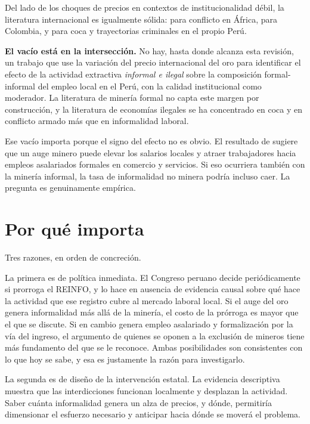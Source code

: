 \documentclass[11pt,a4paper]{article}
\begin{document}
Del lado de los choques de precios en contextos de institucionalidad débil, la literatura internacional es igualmente sólida: \citet{berman2017} para conflicto en África, \citet{dube2013} para Colombia, y \citet{sviatschi2022} para coca y trayectorias criminales en el propio Perú.

\textbf{El vacío está en la intersección.} No hay, hasta donde alcanza esta revisión, un trabajo que use la variación del precio internacional del oro para identificar el efecto de la actividad extractiva \emph{informal e ilegal} sobre la composición formal-informal del empleo local en el Perú, con la calidad institucional como moderador. La literatura de minería formal no capta este margen por construcción, y la literatura de economías ilegales se ha concentrado en coca y en conflicto armado más que en informalidad laboral.

Ese vacío importa porque el signo del efecto no es obvio. El resultado de \citet{aragon2013} sugiere que un auge minero puede elevar los salarios locales y atraer trabajadores hacia empleos asalariados formales en comercio y servicios. Si eso ocurriera también con la minería informal, la tasa de informalidad no minera podría incluso caer. La pregunta es genuinamente empírica.

\section{Por qué importa}

Tres razones, en orden de concreción.

La primera es de política inmediata. El Congreso peruano decide periódicamente si prorroga el REINFO, y lo hace en ausencia de evidencia causal sobre qué hace la actividad que ese registro cubre al mercado laboral local. Si el auge del oro genera informalidad más allá de la minería, el costo de la prórroga es mayor que el que se discute. Si en cambio genera empleo asalariado y formalización por la vía del ingreso, el argumento de quienes se oponen a la exclusión de mineros tiene más fundamento del que se le reconoce. Ambas posibilidades son consistentes con lo que hoy se sabe, y esa es justamente la razón para investigarlo.

La segunda es de diseño de la intervención estatal. La evidencia descriptiva muestra que las interdicciones funcionan localmente y desplazan la actividad. Saber cuánta informalidad genera un alza de precios, y dónde, permitiría dimensionar el esfuerzo necesario y anticipar hacia dónde se moverá el problema.
\end{document}
